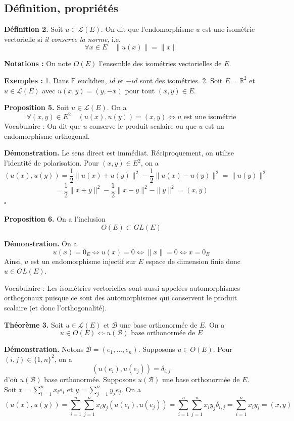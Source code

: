 \subsection{Définition, propriétés}

\textbf{Définition 2.} Soit $u \in \mathcal{L}(E)$. On dit que l'endomorphisme $u$ est une isométrie vectorielle si \textit{il conserve la norme}, i.e.
\[
\forall x \in E \quad \|u(x)\| = \|x\|
\]

\textbf{Notations :} On note $O(E)$ l'ensemble des isométries vectorielles de $E$.

\textbf{Exemples :}
1. Dans $\mathbb{E}$ euclidien, $id$ et $-id$ sont des isométries.
2. Soit $E = \mathbb{R}^2$ et $u \in \mathcal{L}(E)$ avec $u(x, y) = (y, -x)$ pour tout $(x, y) \in E$.

\textbf{Proposition 5.} Soit $u \in \mathcal{L}(E)$. On a
\[
\forall (x, y) \in E^2 \quad (u(x), u(y)) = (x, y) \iff u \text{ est une isométrie}
\]
Vocabulaire : On dit que $u$ conserve le produit scalaire ou que $u$ est un endomorphisme orthogonal.

\textbf{Démonstration.} Le sens direct est immédiat. Réciproquement, on utilise l'identité de polarisation. Pour $(x, y) \in E^2$, on a
\[
(u(x), u(y)) = \frac{1}{2} \|u(x) + u(y)\|^2 - \frac{1}{2} \|u(x) - u(y)\|^2 = \|u(y)\|^2
\]
\[
= \frac{1}{2} \|x + y\|^2 - \frac{1}{2} \|x - y\|^2 - \|y\|^2 = (x, y)
\]
\hfill $\square$

\textbf{Proposition 6.} On a l'inclusion
\[
O(E) \subset GL(E)
\]

\textbf{Démonstration.} On a
\[
u(x) = 0_E \iff u(x) = 0 \iff \|x\| = 0 \iff x = 0_E
\]
Ainsi, $u$ est un endomorphisme injectif sur $E$ espace de dimension finie donc $u \in GL(E)$.

Vocabulaire : Les isométries vectorielles sont aussi appelées automorphismes orthogonaux puisque ce sont des automorphismes qui conservent le produit scalaire (et donc l'orthogonalité).

\textbf{Théorème 3.} Soit $u \in \mathcal{L}(E)$ et $\mathcal{B}$ une base orthonormée de $E$. On a
\[
u \in O(E) \iff u(\mathcal{B}) \text{ base orthonormée de } E
\]

\textbf{Démonstration.} Notons $\mathcal{B} = (e_1, ..., e_n)$. Supposons $u \in O(E)$. Pour $(i, j) \in \{1, n\}^2$, on a
\[
(u(e_i), u(e_j)) = \delta_{i, j}
\]
d'où $u(\mathcal{B})$ base orthonormée. Supposons $u(\mathcal{B})$ une base orthonormée de $E$. Soit $x = \sum_{i=1}^n x_i e_i$ et $y = \sum_{j=1}^n y_j e_j$. On a
\[
(u(x), u(y)) = \sum_{i=1}^n \sum_{j=1}^n x_i y_j (u(e_i), u(e_j)) = \sum_{i=1}^n \sum_{j=1}^n x_i y_j \delta_{i, j} = \sum_{i=1}^n x_i y_i = (x, y)
\]

